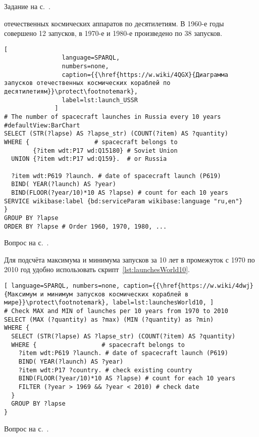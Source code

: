 \begin{task}
\small{Задание на с.~\pageref{question:ship_3}.}
\end{task}


\begin{task}
    \label{answer:launches_USSR}
     отечественных космических аппаратов по десятилетиям.
    В 1960-е годы совершено 12 запусков, в 1970-е и 1980-е произведено по 38 запусков.

    \begin{lstlisting}[ 
                language=SPARQL, 
                numbers=none, 
                caption={{\href{https://w.wiki/4QGX}{Диаграмма запусков отечественных космических кораблей по десятилетиям}}\protect\footnotemark}, 
                label=lst:launch_USSR
              ]
# The number of spacecraft launches in Russia every 10 years
#defaultView:BarChart
SELECT (STR(?lapse) AS ?lapse_str) (COUNT(?item) AS ?quantity)
WHERE {                  # spacecraft belongs to
        {?item wdt:P17 wd:Q15180} # Soviet Union
  UNION {?item wdt:P17 wd:Q159}.  # or Russia
  
  ?item wdt:P619 ?launch. # date of spacecraft launch (P619)
  BIND( YEAR(?launch) AS ?year) 
  BIND(FLOOR(?year/10)*10 AS ?lapse) # count for each 10 years
SERVICE wikibase:label {bd:serviceParam wikibase:language "ru,en"}
} 
GROUP BY ?lapse
ORDER BY ?lapse # Order 1960, 1970, 1980, ...    \end{lstlisting}
    \small{Вопрос на с.~\pageref{question:spacecraft_1}.}
\end{task}

\begin{task}
    \label{answer:launches_world}
    Для подсчёта максимума и минимума запусков за 10 лет в промежуток с 1970 по 2010 год удобно использовать скрипт~\ref{lst:launchesWorld10}.
    \begin{lstlisting}[ language=SPARQL, numbers=none, caption={{\href{https://w.wiki/4dwj}{Максимум и минимум запусков космических кораблей в мире}}\protect\footnotemark}, label=lst:launchesWorld10, ]
# Check MAX and MIN of launches per 10 years from 1970 to 2010
SELECT (MAX (?quantity) as ?max) (MIN (?quantity) as ?min)
WHERE {
  SELECT (STR(?lapse) AS ?lapse_str) (COUNT(?item) AS ?quantity)
  WHERE {                  # spacecraft belongs to
    ?item wdt:P619 ?launch. # date of spacecraft launch (P619)
    BIND( YEAR(?launch) AS ?year) 
    ?item wdt:P17 ?country. # check existing country
    BIND(FLOOR(?year/10)*10 AS ?lapse) # count for each 10 years
    FILTER (?year > 1969 && ?year < 2010) # check date
  } 
  GROUP BY ?lapse
} \end{lstlisting}
    \small{Вопрос на с.~\pageref{question:spacecraft_2}.}
\end{task}

